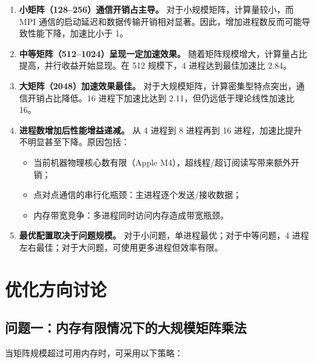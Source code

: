 \documentclass[UTF8,a4paper,12pt]{ctexart}
\begin{document}
\begin{enumerate}[leftmargin=2.2em]
  \item \textbf{小矩阵（128--256）通信开销占主导。} 对于小规模矩阵，计算量较小，而 MPI 通信的启动延迟和数据传输开销相对显著。因此，增加进程数反而可能导致性能下降，加速比小于 1。

  \item \textbf{中等矩阵（512--1024）呈现一定加速效果。} 随着矩阵规模增大，计算量占比提高，并行收益开始显现。在 512 规模下，4 进程达到最佳加速比 2.84。

  \item \textbf{大矩阵（2048）加速效果最佳。} 对于大规模矩阵，计算密集型特点突出，通信开销占比降低。16 进程下加速比达到 2.11，但仍远低于理论线性加速比 16。

  \item \textbf{进程数增加后性能增益递减。} 从 4 进程到 8 进程再到 16 进程，加速比提升不明显甚至下降。原因包括：\begin{itemize}
    \item 当前机器物理核心数有限（Apple M4），超线程/超订阅读写带来额外开销；
    \item 点对点通信的串行化瓶颈：主进程逐个发送/接收数据；
    \item 内存带宽竞争：多进程同时访问内存造成带宽瓶颈。
  \end{itemize}

  \item \textbf{最优配置取决于问题规模。} 对于小问题，单进程最优；对于中等问题，4 进程左右最佳；对于大问题，可使用更多进程但效率有限。
\end{enumerate}

\section{优化方向讨论}

\subsection{问题一：内存有限情况下的大规模矩阵乘法}

当矩阵规模超过可用内存时，可采用以下策略：
\end{document}
